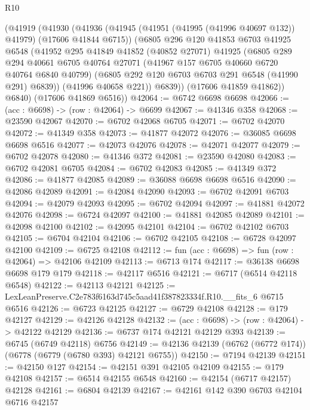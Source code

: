 \begin{lexlean}{R10}
\begin{coremodule}
      (@41919
        (@41930
          (@41936
            (@41945 (@41951 (@41995 (@41996 @40697 @132)) @41979) (@17606 @41844 @6715))
            (@6805
              @296
              @120
              @41853
              @6703
              @41925
              @6548
              (@41952
                @295
                @41849
                @41852
                (@40852 @27071)
                @41925
                (@6805
                  @289
                  @294
                  @40661
                  @6705
                  @40764
                  @27071
                  (@41967 @157 @6705 @40660 @6720 @40764 @6840 @40799)
                  (@6805 @292 @120 @6703 @6703 @291 @6548 (@41990 @291) @6839))
                (@41996 @40658 @221))
              @6839))
          (@17606 @41859 @41862))
        @6840)
      (@17606 @41869 @6516))
@42064 := @6742 @6698 @6698
@42066 := (acc : @6698) -> (row : @42064) -> @6699
@42067 := @41346 @358
@42068 := @23590 @42067
@42070 := @6702 @42068 @6705
@42071 := @6702 @42070
@42072 := @41349 @358
@42073 := @41877 @42072
@42076 := @36085 @6698 @6698 @6516
@42077 := @42073 @42076
@42078 := @42071 @42077
@42079 := @6702 @42078
@42080 := @41346 @372
@42081 := @23590 @42080
@42083 := @6702 @42081 @6705
@42084 := @6702 @42083
@42085 := @41349 @372
@42086 := @41877 @42085
@42089 := @36088 @6698 @6698 @6516
@42090 := @42086 @42089
@42091 := @42084 @42090
@42093 := @6702 @42091 @6703
@42094 := @42079 @42093
@42095 := @6702 @42094
@42097 := @41881 @42072 @42076
@42098 := @6724 @42097
@42100 := @41881 @42085 @42089
@42101 := @42098 @42100
@42102 := @42095 @42101
@42104 := @6702 @42102 @6703
@42105 := @6704 @42104
@42106 := @6702 @42105
@42108 := @6728 @42097 @42100
@42109 := @6725 @42108
@42112 := fun (acc : @6698) => fun (row : @42064) => @42106 @42109
@42113 := @6713 @174
@42117 := @36138 @6698 @6698 @179 @179
@42118 := @42117 @6516
@42121 := @6717 (@6514 @42118 @6548)
@42122 := @42113 @42121
@42125 := LexLeanPreserve.C2e783f6163d745c5aad41f387823334f.R10.__fits_6 @6715 @6516
@42126 := @6723 @42125
@42127 := @6729 @42108
@42128 := @179 @42127
@42129 := @42126 @42128
@42132 := (acc : @6698) -> (row : @42064) -> @42122 @42129
@42136 := @6737 @174 @42121 @42129 @393
@42139 := @6745 (@6749 @42118) @6756
@42149 := @42136 @42139 (@6762 (@6772 @174)) (@6778 (@6779 (@6780 @393) @42121 @6755))
@42150 := @7194 @42139
@42151 := @42150 @127
@42154 := @42151 @391 @42105 @42109
@42155 := @179 @42108
@42157 := @6514 @42155 @6548
@42160 := @42154 (@6717 @42157) @42128
@42161 := @6804 @42139
@42167 := @42161 @142 @390 @6703 @42104 @6716 @42157

\end{coremodule}
\end{lexlean}
